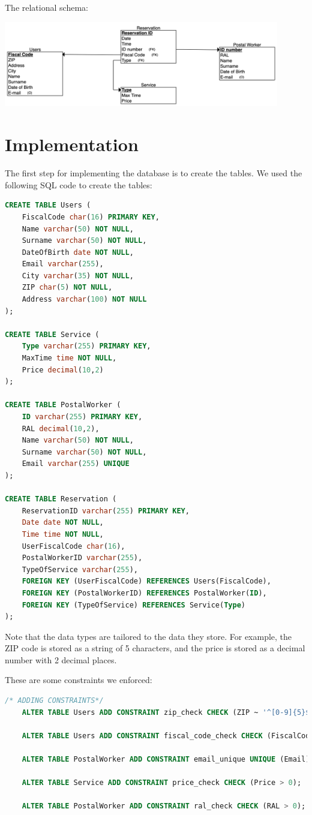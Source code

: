\documentclass{article}
\begin{document}
The relational schema:
\begin{center}
\includegraphics[width=12cm]{images/relationalSchema.png}
\end{center}

\section{Implementation}
The first step for implementing the database is to create the tables. We used the following SQL code to create the tables:

\begin{lstlisting}[language=SQL]
CREATE TABLE Users (
    FiscalCode char(16) PRIMARY KEY,
    Name varchar(50) NOT NULL,
    Surname varchar(50) NOT NULL,
    DateOfBirth date NOT NULL,
    Email varchar(255),
    City varchar(35) NOT NULL,
    ZIP char(5) NOT NULL,
    Address varchar(100) NOT NULL
);

CREATE TABLE Service (
    Type varchar(255) PRIMARY KEY,
    MaxTime time NOT NULL,
    Price decimal(10,2)
);

CREATE TABLE PostalWorker (
    ID varchar(255) PRIMARY KEY,
    RAL decimal(10,2),
    Name varchar(50) NOT NULL,
    Surname varchar(50) NOT NULL,
    Email varchar(255) UNIQUE
);

CREATE TABLE Reservation (
    ReservationID varchar(255) PRIMARY KEY,
    Date date NOT NULL,
    Time time NOT NULL,
    UserFiscalCode char(16),
    PostalWorkerID varchar(255),
    TypeOfService varchar(255),
    FOREIGN KEY (UserFiscalCode) REFERENCES Users(FiscalCode),
    FOREIGN KEY (PostalWorkerID) REFERENCES PostalWorker(ID),
    FOREIGN KEY (TypeOfService) REFERENCES Service(Type)
);
\end{lstlisting}

Note that the data types are tailored to the data they store. For example, the ZIP code is stored as a string of 5 characters, and the price is stored as a decimal number with 2 decimal places.

These are some constraints we enforced:
\begin{lstlisting}[language=SQL]
    /* ADDING CONSTRAINTS*/
    ALTER TABLE Users ADD CONSTRAINT zip_check CHECK (ZIP ~ '^[0-9]{5}$');
    
    ALTER TABLE Users ADD CONSTRAINT fiscal_code_check CHECK (FiscalCode ~ '^[A-Z]{6}[0-9]{2}[A-Z][0-9]{2}[A-Z][0-9]{3}[A-Z]$');
    
    ALTER TABLE PostalWorker ADD CONSTRAINT email_unique UNIQUE (Email);
    
    ALTER TABLE Service ADD CONSTRAINT price_check CHECK (Price > 0);
    
    ALTER TABLE PostalWorker ADD CONSTRAINT ral_check CHECK (RAL > 0);
\end{lstlisting}
\end{document}
